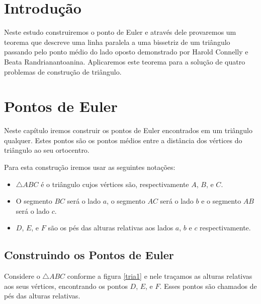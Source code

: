 \documentclass[12pt, openright, a4paper, brazil, openany, oneside]{abntex2}
\begin{document}


\frenchspacing 
\imprimircapa
\imprimirfolhaderosto*
\ABNTEXchapterfont
{}
\tableofcontents*
\cleardoublepage
\textual

\chapter*[Introdução]{Introdução}


Neste estudo construiremos o ponto de Euler e através dele provaremos um teorema que descreve uma linha paralela a uma bissetriz de um triângulo passando pelo ponto médio do lado oposto demonstrado por Harold Connelly e Beata Randrianantoanina\cite{con2}. Aplicaremos este teorema para a solução de quatro problemas de construção de triângulo.



\chapter{Pontos de Euler}

Neste capítulo iremos construir os pontos de Euler encontrados em um triângulo qualquer. Estes pontos são os pontos médios entre a distância dos vértices do triângulo ao seu ortocentro.

Para esta construção iremos usar as seguintes notações:

\begin{itemize}
\item $\triangle ABC$ é o triângulo cujos vértices são, respectivamente $A$, $B$, e $C$.
\item O segmento $BC$ será o lado $a$, o segmento $AC$ será o lado $b$ e o segmento $AB$ será o lado $c$.



\item $D$, $E$, e $F$ são os pés das alturas relativas aos lados $a$, $b$ e $c$ respectivamente.


\end{itemize} 


\section{Construindo os Pontos de Euler}

Considere o $\triangle ABC$ conforme a figura \ref{tria1} e nele traçamos as alturas relativas aos seus vértices, encontrando os pontos $D$, $E$, e $F$. Esses pontos são chamados de pés das alturas relativas.
\end{document}
